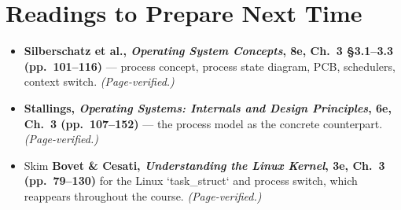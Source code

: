 \documentclass[11pt]{article}
\begin{document}
\section{Readings to Prepare Next Time}

\begin{itemize}
  \item \textbf{Silberschatz et al., \emph{Operating System Concepts}, 8e, Ch.~3 \S3.1--3.3 (pp.~101--116)} --- process concept, process state diagram, PCB, schedulers, context switch. \emph{(Page-verified.)}
  \item \textbf{Stallings, \emph{Operating Systems: Internals and Design Principles}, 6e, Ch.~3 (pp.~107--152)} --- the process model as the concrete counterpart. \emph{(Page-verified.)}
  \item Skim \textbf{Bovet \& Cesati, \emph{Understanding the Linux Kernel}, 3e, Ch.~3 (pp.~79--130)} for the Linux `task\_struct` and process switch, which reappears throughout the course. \emph{(Page-verified.)}
\end{itemize}
\end{document}
